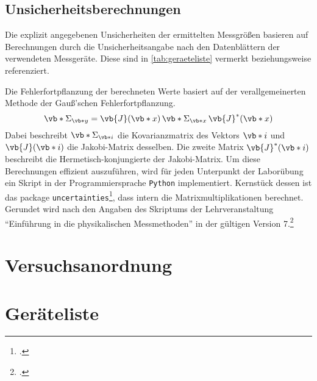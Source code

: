 \documentclass[ngerman]{scrartcl}
\begin{document}
\subsection{Unsicherheitsberechnungen}
\label{subsec:unsicherheitsberechnungen}

Die explizit angegebenen Unsicherheiten der ermittelten Messgrößen basieren auf Berechnungen durch die Unsicherheitsangabe nach den Datenblättern der verwendeten Messgeräte. Diese sind in \autoref{tab:geraeteliste} vermerkt beziehungsweise referenziert.

Die Fehlerfortpflanzung der berechneten Werte basiert auf der verallgemeinerten Methode der Gauß'schen Fehlerfortpflanzung.
\[\vb*{\Sigma}_{\vb*{y}} = \vb{J}(\vb*{x}) \, \vb*{\Sigma}_{\vb*{x}} \, \vb{J}^*(\vb*{x})\]
Dabei beschreibt $\displaystyle \vb*{\Sigma}_{\vb*{i}}$ die Kovarianzmatrix des Vektors $\vb*{i}$ und $\vb{J}(\vb*{i})$ die Jakobi-Matrix desselben. Die zweite Matrix $\vb{J}^*(\vb*{i})$ beschreibt die Hermetisch-konjungierte der Jakobi-Matrix. Um diese Berechnungen effizient auszuführen, wird für jeden Unterpunkt der Laborübung ein Skript in der Programmiersprache \verb!Python! implementiert. Kernstück dessen ist das package \verb!uncertainties!\footcite{ref:uncertainties}, dass intern die Matrixmultiplikationen berechnet. Gerundet wird nach den Angaben des Skriptums der Lehrveranstaltung \enquote{Einführung in die physikalischen Messmethoden} in der gültigen Version 7.\footcite{ref:messmethoden}



\section{Versuchsanordnung}
\label{sec:versuchsanordnung}



\section{Geräteliste}
\label{sec:geraeteliste}
\end{document}
